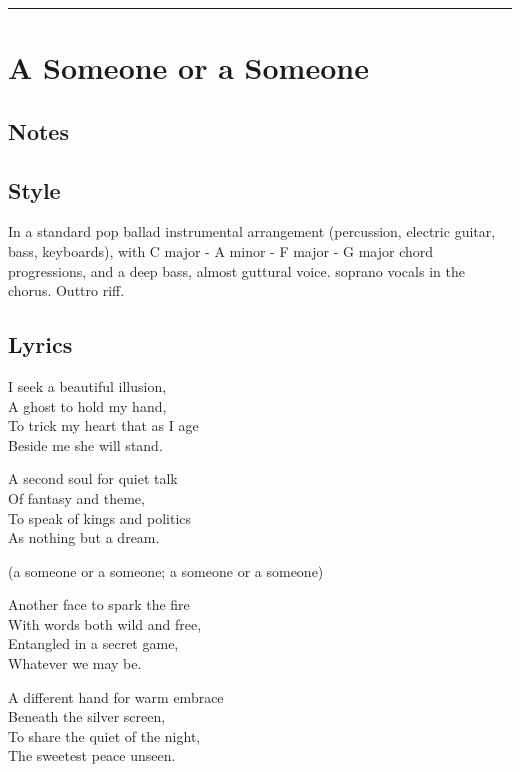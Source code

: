 \documentclass[]{article}
\begin{document}
\begin{center}\rule{0.5\linewidth}{0.5pt}\end{center}

\section{A Someone or a Someone}\label{a-someone-or-a-someone}

\subsection{Notes}\label{notes-1}

\subsection{Style}\label{style-1}

In a standard pop ballad instrumental arrangement (percussion, electric
guitar, bass, keyboards), with C major - A minor - F major - G major
chord progressions, and a deep bass, almost guttural voice. soprano
vocals in the chorus. Outtro riff.

\subsection{Lyrics}\label{lyrics-1}

I seek a beautiful illusion,\\
A ghost to hold my hand,\\
To trick my heart that as I age\\
Beside me she will stand.

A second soul for quiet talk\\
Of fantasy and theme,\\
To speak of kings and politics\\
As nothing but a dream.

(a someone or a someone; a someone or a someone)

Another face to spark the fire\\
With words both wild and free,\\
Entangled in a secret game,\\
Whatever we may be.

A different hand for warm embrace\\
Beneath the silver screen,\\
To share the quiet of the night,\\
The sweetest peace unseen.
\end{document}

